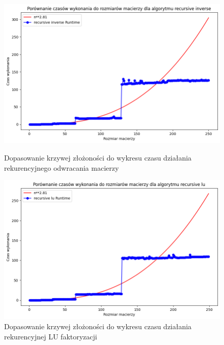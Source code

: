 \documentclass{article}
\begin{document}
\begin{figure}[H]
    \centering
    \begin{minipage}{0.45\textwidth}
        \includegraphics[width=\linewidth]{images/inverse_curve.png}
        \caption{Dopasowanie krzywej złożoności do wykresu czasu działania rekurencyjnego odwracania macierzy}
    \end{minipage}%
    \hfill
    \begin{minipage}{0.45\textwidth}
        \includegraphics[width=\linewidth]{images/lu_curve.png}
        \caption{Dopasowanie krzywej złożoności do wykresu czasu działania rekurencyjnej LU faktoryzacji}
    \end{minipage}

    \vspace{0.5cm} %


\end{figure}
\end{document}
